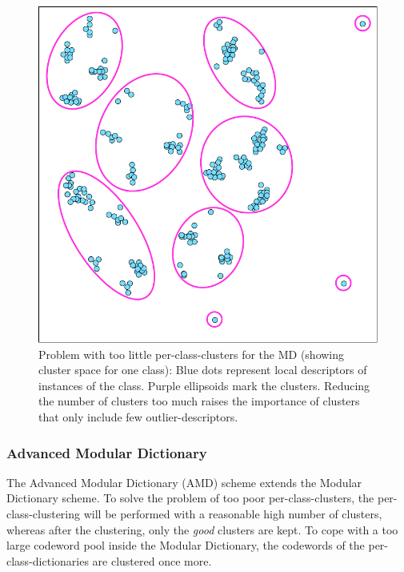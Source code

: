 \begin{figure}[btph]
  \centering
        \includegraphics[width=.45\linewidth]{gfx/modular_dict_clusters}
        \caption{Problem with too little per-class-clusters for the MD (showing cluster space for one class): Blue dots represent local descriptors of instances of the class. Purple ellipsoids mark the clusters. Reducing the number of clusters too much raises the importance of clusters that only include few outlier-descriptors.}
        \label{fig:modularDictionaryClusters}
\end{figure}

\subsubsection{Advanced Modular Dictionary}
The Advanced Modular Dictionary (AMD) scheme extends the Modular Dictionary scheme. To solve the problem of too poor per-class-clusters, the per-class-clustering will be performed with a reasonable high number of clusters, whereas after the clustering, only the \emph{good} clusters are kept. To cope with a too large codeword pool inside the Modular Dictionary, the codewords of the per-class-dictionaries are clustered once more.

